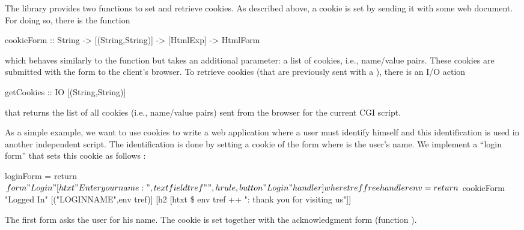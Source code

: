 The library  provides two functions to set
and retrieve cookies.
As described above, a cookie is set by sending it with some
web document. For doing so, there is the function
%
\begin{curry}
cookieForm :: String -> [(String,String)] -> [HtmlExp] -> HtmlForm
\end{curry}
%
which behaves similarly to the function  but
takes an additional parameter: a list of cookies, i.e.,
name/value pairs. These cookies are submitted with the form
to the client's browser. To retrieve cookies (that are previously sent
with a ), there is an I/O action
%
\begin{curry}
getCookies :: IO [(String,String)]
\end{curry}
%
that returns the list of all cookies (i.e., name/value pairs)
sent from the browser for the current CGI script.

As a simple example, we want to use cookies to write a web application
where a user must identify himself and this identification is used
in another independent script. The identification is done
by setting a cookie of the form 
where  is the user's name.
We implement a ``login form'' that sets this cookie as follows
:
\begin{curry}
loginForm = return $ form "Login"
  [htxt "Enter your name: ", textfield tref "",
   hrule,
   button "Login" handler
  ]
 where
   tref free

   handler env = return $
     cookieForm "Logged In"
                [("LOGINNAME",env tref)]
                [h2 [htxt \$ env tref ++ ": thank you for visiting us"]]
\end{curry}
The first form asks the user for his name.
The cookie is set together with the acknowledgment form
(function ).

